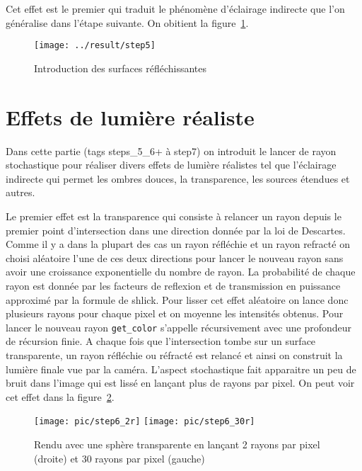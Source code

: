 \documentclass[12pt]{article}
\newcommand\id[1]{\texttt{#1}}
\begin{document}
Cet effet est le premier qui traduit le phénomène d'éclairage indirecte que l'on généralise dans l'étape suivante.
On obitient la figure~\ref{fig:step5}.

\begin{figure}[ht]
  \centering
  \texttt{[image: ../result/step5]}
  \caption{Introduction des surfaces réfléchissantes}\label{fig:step5}
\end{figure}


\section{Effets de lumière réaliste\label{sec:light}}
Dans cette partie (tags steps\_5\_6+ à step7) on introduit le lancer de rayon stochastique pour réaliser divers effets de lumière réalistes tel que l'éclairage indirecte qui permet les ombres douces, la transparence, les sources étendues et autres.

Le premier effet est la transparence qui consiste à relancer un rayon depuis le premier point d'intersection dans une direction donnée par la loi de Descartes.
Comme il y a dans la plupart des cas un rayon réfléchie et un rayon refracté on choisi aléatoire l'une de ces deux directions pour lancer le nouveau rayon sans avoir une croissance exponentielle du nombre de rayon.
La probabilité de chaque rayon est donnée par les facteurs de reflexion et de transmission en puissance approximé par la formule de shlick.
Pour lisser cet effet aléatoire on lance donc plusieurs rayons pour chaque pixel et on moyenne les intensités obtenus.
Pour lancer le nouveau rayon \id{get\_color} s'appelle récursivement avec une profondeur de récursion finie.
A chaque fois que l'intersection tombe sur un surface transparente, un rayon réfléchie ou réfracté est relancé et ainsi on construit la lumière finale vue par la caméra.
L'aspect stochastique fait apparaitre un peu de bruit dans l'image qui est lissé en lançant plus de rayons par pixel.
On peut voir cet effet dans la figure~\ref{fig:step6.5}.

\begin{figure}[ht]
  \centering
  \texttt{[image: pic/step6\_2r]}
  \texttt{[image: pic/step6\_30r]}
  \caption{Rendu avec une sphère transparente en lançant 2 rayons par pixel (droite) et 30 rayons par pixel (gauche)}\label{fig:step6.5}
\end{figure}
\end{document}

